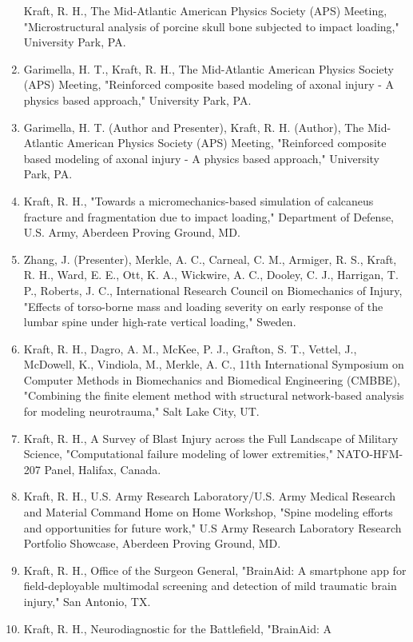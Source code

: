 \documentclass[
]{article}
\begin{document}
\begin{enumerate}
  Kraft, R. H., The Mid-Atlantic American Physics Society (APS) Meeting,
  "Microstructural analysis of porcine skull bone subjected to impact
  loading," University Park, PA.
\item
  Garimella, H. T., Kraft, R. H., The Mid-Atlantic American Physics
  Society (APS) Meeting, "Reinforced composite based modeling of axonal
  injury - A physics based approach," University Park, PA.
\item
  Garimella, H. T. (Author and Presenter), Kraft, R. H. (Author), The
  Mid-Atlantic American Physics Society (APS) Meeting, "Reinforced
  composite based modeling of axonal injury - A physics based approach,"
  University Park, PA.
\item
  Kraft, R. H., "Towards a micromechanics-based simulation of calcaneus
  fracture and fragmentation due to impact loading," Department of
  Defense, U.S. Army, Aberdeen Proving Ground, MD.
\item
  Zhang, J. (Presenter), Merkle, A. C., Carneal, C. M., Armiger, R. S.,
  Kraft, R. H., Ward, E. E., Ott, K. A., Wickwire, A. C., Dooley, C. J.,
  Harrigan, T. P., Roberts, J. C., International Research Council on
  Biomechanics of Injury, "Effects of torso-borne mass and loading
  severity on early response of the lumbar spine under high-rate
  vertical loading," Sweden.
\item
  Kraft, R. H., Dagro, A. M., McKee, P. J., Grafton, S. T., Vettel, J.,
  McDowell, K., Vindiola, M., Merkle, A. C., 11th International
  Symposium on Computer Methods in Biomechanics and Biomedical
  Engineering (CMBBE), "Combining the finite element method with
  structural network-based analysis for modeling neurotrauma," Salt Lake
  City, UT.
\item
  Kraft, R. H., A Survey of Blast Injury across the Full Landscape of
  Military Science, "Computational failure modeling of lower
  extremities," NATO-HFM-207 Panel, Halifax, Canada.
\item
  Kraft, R. H., U.S. Army Research Laboratory/U.S. Army Medical Research
  and Material Command Home on Home Workshop, "Spine modeling efforts
  and opportunities for future work," U.S Army Research Laboratory
  Research Portfolio Showcase, Aberdeen Proving Ground, MD.
\item
  Kraft, R. H., Office of the Surgeon General, "BrainAid: A smartphone
  app for field-deployable multimodal screening and detection of mild
  traumatic brain injury," San Antonio, TX.
\item
  Kraft, R. H., Neurodiagnostic for the Battlefield, "BrainAid: A

\end{enumerate}
\end{document}
